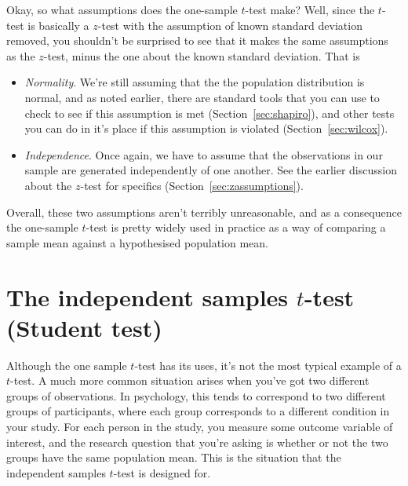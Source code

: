 Okay, so what assumptions does the one-sample $t$-test make? Well, since the $t$-test is basically a $z$-test with the assumption of known standard deviation removed, you shouldn't be surprised to see that it makes the same assumptions as the $z$-test, minus the one about the known standard deviation. That is
\begin{itemize}
\item {\it Normality}. We're still assuming that the the population distribution is normal, and as noted earlier, there are standard tools that you can use to check to see if this assumption is met (Section~\ref{sec:shapiro}), and other tests you can do in it's place if this assumption is violated (Section~\ref{sec:wilcox}).
\item {\it Independence}. Once again, we have to assume that the observations in our sample are generated independently of one another. See the earlier discussion about the $z$-test for specifics (Section~\ref{sec:zassumptions}).
\end{itemize}
Overall, these two assumptions aren't terribly unreasonable, and as a consequence the one-sample $t$-test is pretty widely used in practice as a way of comparing a sample mean against a hypothesised population mean.


\section{The independent samples $t$-test (Student test)~\label{sec:studentttest}}

Although the one sample $t$-test has its uses, it's not the most typical example of a $t$-test. A much more common situation arises when you've got two different groups of observations. In psychology, this tends to correspond to two different groups of participants, where each group corresponds to a different condition in your study. For each person in the study, you measure some outcome variable of interest, and the research question that you're asking is whether or not the two groups have the same population mean. This is the situation that the independent samples $t$-test is designed for. 


